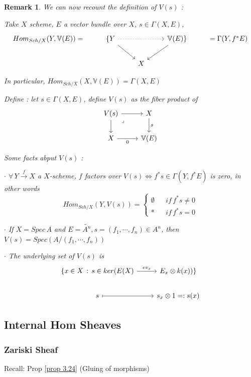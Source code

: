 \documentclass{article}
\newtheorem{remark}[theorem]{Remark}
\begin{document}
\begin{remark}
    We can now recount the definition of $V(s)$ :

    Take $X$ scheme, $E$ a vector bundle over $X$, $s\in\Gamma(X,E)$, 
    \[\begin{tikzcd}
	{Hom_{Sch/X}(Y,\mathbb V(E))=} & {\{Y} && {\mathbb V(E)\}} & {=\Gamma(Y,f^\ast E)} \\
	&& X
	\arrow[from=1-2, to=2-3]
	\arrow[dotted, from=1-2, to=1-4]
	\arrow[from=1-4, to=2-3]
\end{tikzcd}\]

In particular, $Hom_{Sch/X}(X,\mathbb V(E))=\Gamma(X, E)$

Define : let $s\in \Gamma(X, E)$, define $V(s)$ as the fiber product of 
\[\begin{tikzcd}
	{V(s)} & X \\
	X & {\mathbb V(E)}
	\arrow["0"', from=2-1, to=2-2]
	\arrow["s", from=1-2, to=2-2]
	\arrow[from=1-1, to=2-1]
	\arrow["\lrcorner"{anchor=center, pos=0.125}, draw=none, from=1-1, to=2-2]
	\arrow[from=1-1, to=1-2]
\end{tikzcd}\]

Some facts abput $V(s)$ :

$\cdot$ $\forall\, Y\xrightarrow{f}X$ a $X$-scheme, $f$ factors over $V(s)\Leftrightarrow f^\ast s\in \Gamma(Y,f^\ast E)$ is zero, in other words 
$$ 
Hom_{Sch/X}(Y,V(s))
=\left\{
\begin{array}{rcl}
\emptyset  &      & if \, f^\ast s\ne0\\
\ast  &  & if \, f^\ast s=0
\end{array} \right.
$$

$\cdot$ If $X=Spec\,A$ and $E=\widetilde {A^n},s=(f_1,\cdots,f_n)\in A^n$, then $V(s)=Spec(A/(f_1,\cdots,f_n))$

$\cdot$ The underlying set of $V(s)$ is 
\[\begin{tikzcd}
	{\{x\in X\,:\, s\in ker(E(X)} & {E_x\otimes k(x))\}} \\
	s & {s_x\otimes1=:s(x)}
	\arrow["{ev_x}", from=1-1, to=1-2]
	\arrow[maps to, from=2-1, to=2-2]
\end{tikzcd}\]
\end{remark}


\newpage
\subsection{Internal Hom Sheaves}
\subsubsection{Zariski Sheaf}
Recall:
Prop \ref{prop 3.24} (Gluing of morphisms) 
    
\end{document}
